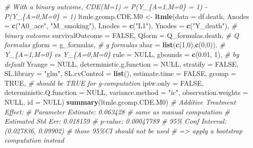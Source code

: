 \documentclass[
]{book}
\newenvironment{Shaded}{\begin{snugshade}}{\end{snugshade}}
\newcommand{\AttributeTok}[1]{\textcolor[rgb]{0.13,0.29,0.53}{#1}}
\newcommand{\CommentTok}[1]{\textcolor[rgb]{0.56,0.35,0.01}{\textit{#1}}}
\newcommand{\ConstantTok}[1]{\textcolor[rgb]{0.56,0.35,0.01}{#1}}
\newcommand{\DecValTok}[1]{\textcolor[rgb]{0.00,0.00,0.81}{#1}}
\newcommand{\FloatTok}[1]{\textcolor[rgb]{0.00,0.00,0.81}{#1}}
\newcommand{\FunctionTok}[1]{\textcolor[rgb]{0.13,0.29,0.53}{\textbf{#1}}}
\newcommand{\NormalTok}[1]{#1}
\newcommand{\OtherTok}[1]{\textcolor[rgb]{0.56,0.35,0.01}{#1}}
\newcommand{\StringTok}[1]{\textcolor[rgb]{0.31,0.60,0.02}{#1}}
\begin{document}
\begin{Shaded}
\begin{Highlighting}[]
\CommentTok{\# With a binary outcome, CDE(M=1) = P(Y\_\{A=1,M=0\} = 1) {-} P(Y\_\{A=0,M=0\} = 1)}
\NormalTok{ltmle.gcomp.CDE.M0 }\OtherTok{\textless{}{-}} \FunctionTok{ltmle}\NormalTok{(}\AttributeTok{data =}\NormalTok{ df.death,}
                            \AttributeTok{Anodes =} \FunctionTok{c}\NormalTok{(}\StringTok{"A0\_ace"}\NormalTok{, }\StringTok{"M\_smoking"}\NormalTok{),}
                            \AttributeTok{Lnodes =} \FunctionTok{c}\NormalTok{(}\StringTok{"L1"}\NormalTok{),}
                            \AttributeTok{Ynodes =} \FunctionTok{c}\NormalTok{(}\StringTok{"Y\_death"}\NormalTok{), }\CommentTok{\# binary outcome}
                            \AttributeTok{survivalOutcome =} \ConstantTok{FALSE}\NormalTok{,}
                            \AttributeTok{Qform =}\NormalTok{ Q\_formulas.death, }\CommentTok{\# Q formulas}
                            \AttributeTok{gform =}\NormalTok{ g\_formulas, }\CommentTok{\# g formulas}
                            \AttributeTok{abar =} \FunctionTok{list}\NormalTok{(}\FunctionTok{c}\NormalTok{(}\DecValTok{1}\NormalTok{,}\DecValTok{0}\NormalTok{),}\FunctionTok{c}\NormalTok{(}\DecValTok{0}\NormalTok{,}\DecValTok{0}\NormalTok{)), }\CommentTok{\# Y\_\{A=1,M=0\} vs Y\_\{A=0,M=0\}}
                            \AttributeTok{rule =} \ConstantTok{NULL}\NormalTok{,}
                            \AttributeTok{gbounds =} \FunctionTok{c}\NormalTok{(}\FloatTok{0.01}\NormalTok{, }\DecValTok{1}\NormalTok{), }\CommentTok{\# by default}
                            \AttributeTok{Yrange =} \ConstantTok{NULL}\NormalTok{,}
                            \AttributeTok{deterministic.g.function =} \ConstantTok{NULL}\NormalTok{,}
                            \AttributeTok{stratify =} \ConstantTok{FALSE}\NormalTok{,}
                            \AttributeTok{SL.library =} \StringTok{"glm"}\NormalTok{,}
                            \AttributeTok{SL.cvControl =} \FunctionTok{list}\NormalTok{(),}
                            \AttributeTok{estimate.time =} \ConstantTok{FALSE}\NormalTok{,}
                            \AttributeTok{gcomp =} \ConstantTok{TRUE}\NormalTok{, }\CommentTok{\# should be TRUE for g{-}computation}
                            \AttributeTok{iptw.only =} \ConstantTok{FALSE}\NormalTok{,}
                            \AttributeTok{deterministic.Q.function =} \ConstantTok{NULL}\NormalTok{,}
                            \AttributeTok{variance.method =} \StringTok{"ic"}\NormalTok{,}
                            \AttributeTok{observation.weights =} \ConstantTok{NULL}\NormalTok{,}
                            \AttributeTok{id =} \ConstantTok{NULL}\NormalTok{)}
\FunctionTok{summary}\NormalTok{(ltmle.gcomp.CDE.M0)}
\CommentTok{\# Additive Treatment Effect:}
\CommentTok{\#   Parameter Estimate:  0.063428 \# same as manual computation}
\CommentTok{\#    Estimated Std Err:  0.018159}
\CommentTok{\#              p{-}value:  0.00047789}
\CommentTok{\#    95\% Conf Interval: (0.027836, 0.09902) \# those 95\%CI should not be used}
\CommentTok{\#                      =\textgreater{} apply a bootstrap computation instead}


\end{Highlighting}
\end{Shaded}
\end{document}
